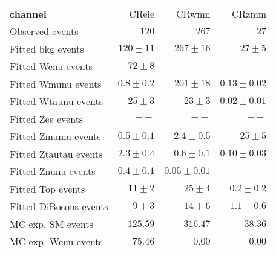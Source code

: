 

\begin{table}
\begin{center}
\setlength{\tabcolsep}{0.0pc}
{\small
\begin{tabular*}{\textwidth}{@{\extracolsep{\fill}}lrrr}
\noalign{\smallskip}\hline\noalign{\smallskip}
{\bf  channel}           & CRele            & CRwmn            & CRzmm              \\[-0.05cm]
\noalign{\smallskip}\hline\noalign{\smallskip}
Observed events          & $120$              & $267$              & $27$                    \\
\noalign{\smallskip}\hline\noalign{\smallskip}
Fitted bkg events         & $120 \pm 11$                  & $267 \pm 16$          & $27 \pm 5$              \\
\noalign{\smallskip}\hline\noalign{\smallskip}
        Fitted Wenu events         & $72 \pm 8$              & $--$                        & $--$              \\
        Fitted Wmunu events         & $0.8 \pm 0.2$          & $201 \pm 18$          & $0.13 \pm 0.02$              \\
        Fitted Wtaunu events         & $25 \pm 3$          & $23 \pm 3$              & $0.02 \pm 0.01$              \\
        Fitted Zee events         & $--$                    & $--$                    & $--$              \\
        Fitted Zmumu events         & $0.5 \pm 0.1$          & $2.4 \pm 0.5$          & $25 \pm 5$              \\
        Fitted Ztautau events         & $2.3 \pm 0.4$          & $0.6 \pm 0.1$          & $0.10 \pm 0.03$              \\
        Fitted Znunu events         & $0.4 \pm 0.1$          & $0.05 \pm 0.01$          & $--$              \\
        Fitted Top events         & $11 \pm 2$             & $25 \pm 4$              & $0.2 \pm 0.2$              \\
        Fitted DiBosons events         & $9 \pm 3$          & $14 \pm 6$             & $1.1 \pm 0.6$              \\
 \noalign{\smallskip}\hline\noalign{\smallskip}
MC exp. SM events              & $125.59$          & $316.47$          & $38.36$              \\
\noalign{\smallskip}\hline\noalign{\smallskip}
        MC exp. Wenu events         & $75.46$          & $0.00$          & $0.00$              \\

\end{tabular*}}
\end{center}
\end{table}
